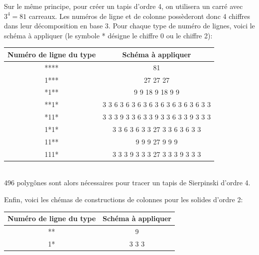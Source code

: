 Sur le même principe, pour créer un tapis d'ordre 4, on utilisera un carré avec $3^4=81$ carreaux. Les numéros de ligne et de colonne possèderont donc 4 chiffres dans leur décomposition en base 3. Pour chaque type de numéro de lignes, voici le schéma à appliquer (le symbole * désigne le chiffre 0 ou le chiffre 2):
\begin{center}
 \begin{tabular}{|c|c|}
 \hline
Numéro de ligne du type & Schéma à appliquer \\
\hline
 **** & 81 \\ 
\hline
1*** &  27 27 27 \\
\hline
*1** & 9 9 18 9 18 9 9 \\
\hline
**1* & 3 3 6 3 6 3 6 3 6 3 6 3 6 3 6 3 6 3 3 \\
\hline
*11* &  3 3 3 9 3 3 6 3 3 9 3 3 6 3 3 9 3 3 3 \\
\hline
1*1* & 3 3 6 3 6 3 3 27 3 3 6 3 6 3 3 \\
\hline
11** & 9 9 9 27 9 9 9 \\
\hline
111*& 3 3 3 9 3 3 3 27 3 3 3 9 3 3 3 \\
\hline
\end{tabular}\\
496 polygônes sont alors nécessaires pour tracer un tapis de Sierpinski d'ordre 4.\\
\end{center}
Enfin, voici les chémas de constructions de colonnes pour les solides d'ordre 2:
\begin{center}
  \begin{tabular}{|c|c|}
 \hline
Numéro de ligne du type & Schéma à appliquer \\
\hline
** &  9 \\
\hline
1* & 3 3 3 \\ 
\hline
\end{tabular}
\end{center}

